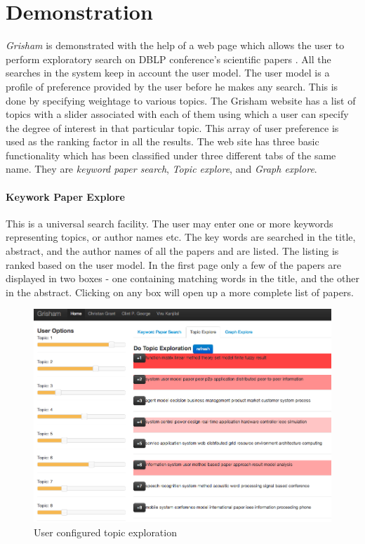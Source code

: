 \section{Demonstration}

\emph{Grisham} is demonstrated with the help of a web page which allows the user to perform exploratory search on DBLP conference's scientific papers \cite{Tang:2008:EMA:1367497.1367722}. All the searches in the system keep in account the user model. The user model is a profile of preference provided by the user before he makes any search. This is done by specifying weightage to various topics. The Grisham website has a list of topics with a slider associated with each of them using which a user can specify the degree of interest in that particular topic. This array of user preference is used as the ranking factor in all the results. The web site has three basic functionality which has been classified under three different tabs of the same name. They are \emph{keyword paper search}, \emph{Topic explore}, and \emph{Graph explore}. 

\paragraph{Keywork Paper Explore} This is a universal search facility. The user may enter one or more keywords representing topics, or author names etc. The key words are searched in the title, abstract, and the author names of all the papers and are listed. The listing is ranked based on the user model. In the first page only a few of the papers are displayed  in two boxes - one containing matching words in the title, and the other in the abstract. Clicking on any box will open up a more complete list of papers.

\begin{figure}[htb]
\includegraphics[scale=.25,trim=0 0 300 0]{images/topic_exploration.png}
\caption{User configured topic exploration}
\label{fig:topic_exploration}
\end{figure}

